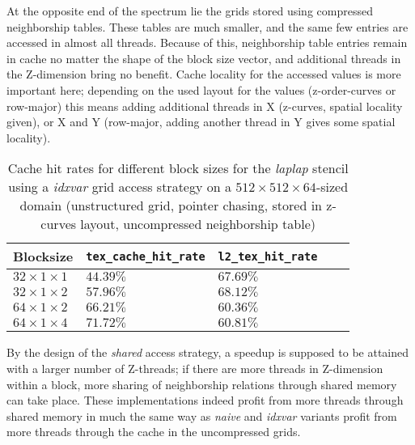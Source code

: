 At the opposite end of the spectrum lie the grids stored using compressed neighborship tables. These tables are much smaller, and the same few entries are accessed in almost all threads. Because of this, neighborship table entries remain in cache no matter the shape of the block size vector, and additional threads in the Z-dimension bring no benefit. Cache locality for the accessed values is more important here; depending on the used layout for the values (z-order-curves or row-major) this means adding additional threads in X (z-curves, spatial locality given), or X and Y (row-major, adding another thread in Y gives some spatial locality).

\begin{table}
	\begin{tabular}{l l l l l}
		Blocksize & \texttt{tex\_cache\_hit\_rate} & \texttt{l2\_tex\_hit\_rate} \\
		\hline
		$32\times 1\times 1$ & $44.39\%$ & $67.69\%$ \\
		$32\times 1\times 2$ & $57.96\%$ & $68.12\%$ \\
		$64\times 1\times 2$ & $66.21\%$ & $60.36\%$ \\
		$64\times 1\times 4$ & $71.72\%$ & $60.81\%$
	\end{tabular}
	\caption{\label{tab:laplap-blocksize-metrics} Cache hit rates for different block sizes for the \emph{laplap} stencil using a \emph{idxvar} grid access strategy on a $512\times 512\times 64$-sized domain (unstructured grid, pointer chasing, stored in z-curves layout, uncompressed neighborship table)}
\end{table}

By the design of the \emph{shared} access strategy, a speedup is supposed to be attained with a larger number of Z-threads; if there are more threads in Z-dimension within a block, more sharing of neighborship relations through shared memory can take place. These implementations indeed profit from more threads through shared memory in much the same way as \emph{naive} and \emph{idxvar} variants profit from more threads through the cache in the uncompressed grids.

